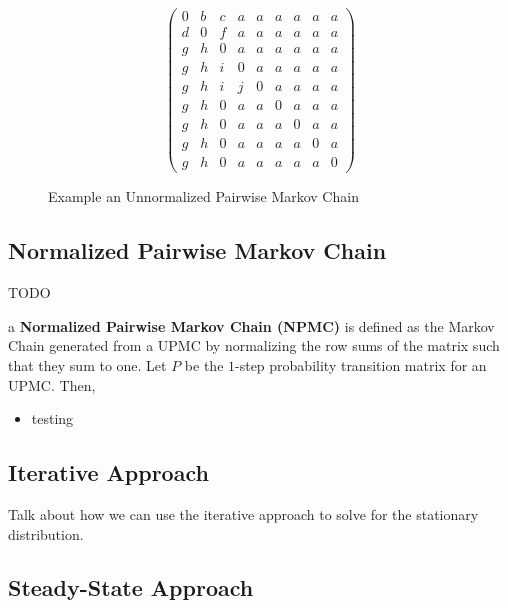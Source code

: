 \documentclass[letterpaper,twocolumn,12pt]{article}
\begin{document}
\begin{figure*}
\begin{equation*}
\left( \begin{array}{ccccccccc}
0 & b & c & a & a & a & a & a & a \\
d & 0 & f & a & a & a & a & a & a \\
g & h & 0 & a & a & a & a & a & a \\
g & h & i & 0 & a & a & a & a & a \\
g & h & i & j & 0 & a & a & a & a \\
g & h & 0 & a & a & 0 & a & a & a \\
g & h & 0 & a & a & a & 0 & a & a \\
g & h & 0 & a & a & a & a & 0 & a \\
g & h & 0 & a & a & a & a & a & 0 \end{array} \right)
\end{equation*}
\caption{Example an Unnormalized Pairwise Markov Chain}
\label{fig:upmc}
\end{figure*}


\subsection{Normalized Pairwise Markov Chain}
TODO

\begin{defn}
a {\bf Normalized Pairwise Markov Chain (NPMC)} is defined as the Markov Chain generated from a UPMC by normalizing the row sums of the matrix such that they sum to one. Let $P$ be the $1$-step probability transition matrix for an UPMC. Then,

\begin{itemize}
\item testing
\end{itemize}

\end{defn}

\subsection{Iterative Approach}

Talk about how we can use the iterative approach to solve for the stationary distribution.

\subsection{Steady-State Approach}
\end{document}
